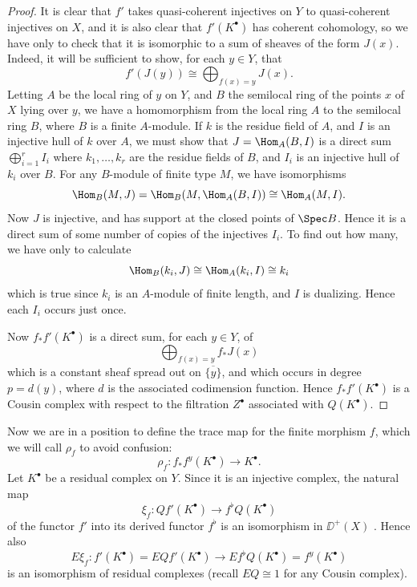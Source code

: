 \begin{proof}
It is clear that $f'$ takes quasi-coherent injectives on $Y$ to quasi-coherent injectives on $X$, and it is also clear that $f'(K^\bullet)$ has coherent cohomology, so we have only to check that it is isomorphic to a sum of sheaves of the form $J(x)$. Indeed, it will be sufficient to show, for each $y\in Y$, that
\[
f'(J(y)) \cong \bigoplus_{f(x)=y} J(x).
\]
Letting $A$ be the local ring of $y$ on $Y$, and $B$ the semilocal ring of the points $x$ of $X$ lying over $y$, we have a homomorphism from the local ring $A$ to the semilocal ring $B$, where $B$ is a finite $A$-module. If $k$ is the residue field of $A$, and $I$ is an injective hull of $k$ over $A$, we must show that $J = \Hom_A(B,I)$ is a direct sum $\bigoplus_{i=1}^{r} I_i$ where $k_1,\dots,k_r$ are the residue fields of $B$, and $I_i$ is an injective hull of $k_i$ over $B$. For any $B$-module of finite type $M$, we have isomorphisms
\[
\Hom_{B}(M,J) = \Hom_{B}(M, \Hom_{A}(B,I)) \cong \Hom_{A}(M,I).
\]
Now $J$ is injective, and has support at the closed points of $\Spec B$. Hence it is a direct sum of some number of copies of the injectives $I_i$. To find out how many, we have only to calculate
\[
\Hom_{B}(k_i,J) \cong \Hom_{A}(k_i,I) \cong k_i
\]
which is true since $k_i$ is an $A$-module of finite length, and $I$ is dualizing. Hence each $I_i$ occurs just once.

Now $f_*f'(K^\bullet)$ is a direct sum, for each $y\in Y$, of
\[
\bigoplus_{f(x)=y} f_* J(x)
\]
which is a constant sheaf spread out on $\overline{\{y\}}$, and which occurs in degree $p = d(y)$, where $d$ is the associated codimension function. Hence $f_*f'(K^\bullet)$ is a Cousin complex with respect to the filtration $Z^\bullet$ associated with $Q(K^\bullet)$.

\end{proof}

\begingroup
\setlength{\emergencystretch}{2em}
Now we are in a position to define the trace map for the finite morphism $f$, which we will call $\rho_f$ to avoid confusion:
\[
\rho_{f}\colon f_{*}f^{y}(K^{\bullet}) \longrightarrow K^{\bullet}.
\]
Let $K^\bullet$ be a residual complex on $Y$. Since it is an injective complex, the natural map
\[
\xi_{f}\colon Qf'(K^\bullet) \longrightarrow f^{\flat}Q(K^\bullet)
\]
of the functor $f'$ into its derived functor $f^{\flat}$ is an isomorphism in $\DD^{+}(X)$ . Hence also
\[
E\xi_{f}\colon f'(K^\bullet) = EQf'(K^\bullet) \longrightarrow Ef^{\flat}Q(K^\bullet) = f^{y}(K^\bullet)
\]
is an isomorphism of residual complexes (recall $EQ \cong 1$ for any Cousin complex).

